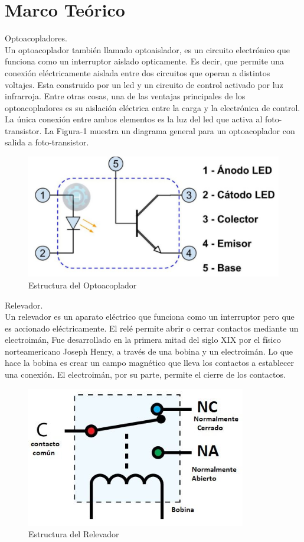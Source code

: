 \documentclass[12pt,a4paper]{article}
\begin{document}
\section{Marco Teórico}
Optoacopladores.\\
Un optoacoplador también llamado optoaislador, es un circuito electrónico que funciona como un interruptor aislado opticamente. Es decir, que permite una conexión eléctricamente aislada entre dos circuitos que operan a distintos voltajes. Esta construido por un led y un circuito de control activado por luz infrarroja. Entre otras cosas, una de las ventajas principales de los optoacopladores es su aislación eléctrica entre la carga y la electrónica de control. La única conexión entre ambos elementos es la luz del led que activa al foto-transistor. La Figura-1 muestra un diagrama general para un optoacoplador con salida a foto-transistor.
\begin{figure}[hbtp]
\centering
\includegraphics[scale=0.6]{Circuito/Opto.PNG}
\caption{Estructura del Optoacoplador}
\end{figure}

Relevador. \\
Un relevador es un aparato eléctrico que funciona como un interruptor pero que es accionado eléctricamente. El relé permite abrir o cerrar contactos mediante un electroimán, Fue desarrollado en la primera mitad del siglo XIX por el físico norteamericano Joseph Henry, a través de una bobina y un electroimán.
Lo que hace la bobina es crear un campo magnético que lleva los contactos a establecer una conexión. El electroimán, por su parte, permite el cierre de los contactos.
\begin{figure}[hbtp]
\centering
\includegraphics[scale=0.6]{Circuito/Rele.PNG}
\caption{Estructura del Relevador}
\end{figure}
\end{document}
